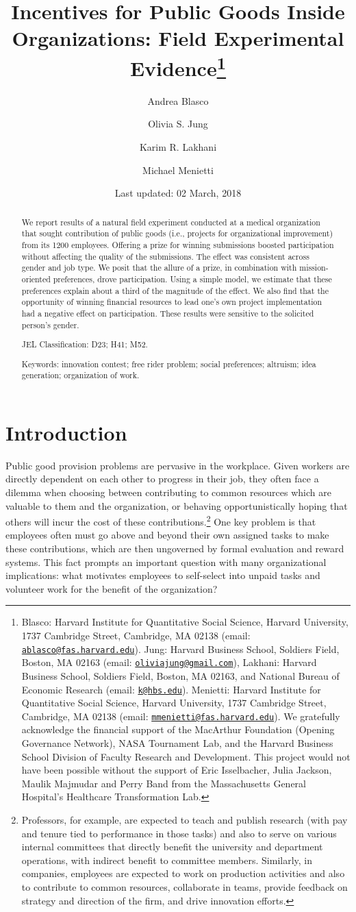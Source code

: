 \documentclass[11pt, titlepage]{article}
\title{Incentives for Public Goods Inside Organizations: Field Experimental
Evidence\thanks{Blasco: Harvard Institute for Quantitative Social Science, Harvard
University, 1737 Cambridge Street, Cambridge, MA 02138 (email:
\href{mailto:ablasco@fas.harvard.edu}{\nolinkurl{ablasco@fas.harvard.edu}}).
Jung: Harvard Business School, Soldiers Field, Boston, MA 02163 (email:
\href{mailto:oliviajung@gmail.com}{\nolinkurl{oliviajung@gmail.com}}),
Lakhani: Harvard Business School, Soldiers Field, Boston, MA 02163, and
National Bureau of Economic Research (email:
\href{mailto:k@hbs.edu}{\nolinkurl{k@hbs.edu}}). Menietti: Harvard
Institute for Quantitative Social Science, Harvard University, 1737
Cambridge Street, Cambridge, MA 02138 (email:
\href{mailto:mmenietti@fas.harvard.edu}{\nolinkurl{mmenietti@fas.harvard.edu}}).
We gratefully acknowledge the financial support of the MacArthur
Foundation (Opening Governance Network), NASA Tournament Lab, and the
Harvard Business School Division of Faculty Research and Development.
This project would not have been possible without the support of Eric
Isselbacher, Julia Jackson, Maulik Majmudar and Perry Band from the
Massachusetts General Hospital's Healthcare Transformation Lab.}}
\author{Andrea Blasco \and Olivia S. Jung \and Karim R. Lakhani \and Michael Menietti}
\date{Last updated: 02 March, 2018}
\begin{document}
\maketitle
\begin{abstract}
We report results of a natural field experiment conducted at a medical
organization that sought contribution of public goods (i.e., projects
for organizational improvement) from its 1200 employees. Offering a
prize for winning submissions boosted participation without affecting
the quality of the submissions. The effect was consistent across gender
and job type. We posit that the allure of a prize, in combination with
mission-oriented preferences, drove participation. Using a simple model,
we estimate that these preferences explain about a third of the
magnitude of the effect. We also find that the opportunity of winning
financial resources to lead one's own project implementation had a
negative effect on participation. These results were sensitive to the
solicited person's gender.

\smallskip\noindent 
JEL Classification: D23; H41; M52.

\smallskip\noindent 
Keywords: innovation contest; free rider problem; social preferences; altruism; idea generation; organization of work.
\end{abstract}


\clearpage
\tableofcontents
\setcounter{tocdepth}{2}
\clearpage

\section{Introduction}\label{introduction}

Public good provision problems are pervasive in the workplace. Given
workers are directly dependent on each other to progress in their job,
they often face a dilemma when choosing between contributing to common
resources which are valuable to them and the organization, or behaving
opportunistically hoping that others will incur the cost of these
contributions.\footnote{Professors, for example, are expected to teach
  and publish research (with pay and tenure tied to performance in those
  tasks) and also to serve on various internal committees that directly
  benefit the university and department operations, with indirect
  benefit to committee members. Similarly, in companies, employees are
  expected to work on production activities and also to contribute to
  common resources, collaborate in teams, provide feedback on strategy
  and direction of the firm, and drive innovation efforts.} One key
problem is that employees often must go above and beyond their own
assigned tasks to make these contributions, which are then ungoverned by
formal evaluation and reward systems. This fact prompts an important
question with many organizational implications: what motivates employees
to self-select into unpaid tasks and volunteer work for the benefit of
the organization?
\end{document}
